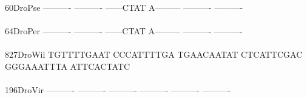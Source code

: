 \documentclass[11pt,twoside,reqno,a4paper]{article}
\begin{document}
{60\hspace*{3\charwidth}DroPse	----------	----------	------CTAT	A---------	----------	----------	\\
\hspace*{5\charwidth}\hspace*{7\charwidth}\hspace*{1\charwidth}\hspace*{1\charwidth}\hspace*{1\charwidth}\hspace*{1\charwidth}\hspace*{1\charwidth}\hspace*{1\charwidth}\\
64\hspace*{3\charwidth}DroPer	----------	----------	------CTAT	A---------	----------	----------	\\
\hspace*{5\charwidth}\hspace*{7\charwidth}\hspace*{1\charwidth}\hspace*{1\charwidth}\hspace*{1\charwidth}\hspace*{1\charwidth}\hspace*{1\charwidth}\hspace*{1\charwidth}\\
827\hspace*{2\charwidth}DroWil	TGTTTTGAAT	CCCATTTTGA	TGAACAATAT	CTCATTCGAC	GGGAAATTTA	ATTCACTATC	\\
\hspace*{5\charwidth}\hspace*{7\charwidth}\hspace*{1\charwidth}\hspace*{1\charwidth}\hspace*{1\charwidth}\hspace*{1\charwidth}\hspace*{1\charwidth}\hspace*{1\charwidth}\\
196\hspace*{2\charwidth}DroVir	----------	----------	----------	----------	----------	----------	\\
\hspace*{5\charwidth}\hspace*{7\charwidth}\hspace*{1\charwidth}\hspace*{1\charwidth}\hspace*{1\charwidth}\hspace*{1\charwidth}\hspace*{1\charwidth}\hspace*{1\charwidth}\\
}
\end{document}
